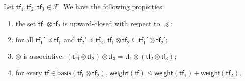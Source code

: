 \documentclass[10pt,a4paper]{article}
\renewcommand{\leq}{\leqslant}
\newcommand*{\transferflows}{\mathcal{F}}
\newcommand*{\tfweight}[1]{\mathsf{weight}(#1)}
\newcommand*{\minwqo}[1]{\mathsf{basis}(#1)}
\newcommand*{\atf}{\mathsf{tf}}
\newcommand*{\tftimes}{\otimes}
\newcommand*{\letf}{\preceq}
\begin{document}
%
\begin{lemmarep}%
	\label{prod-upward-closed}
	Let \(\atf_1, \atf_2, \atf_3 \in \transferflows\).
	We have the following properties:
	\begin{enumerate}[label = "\upshape(\ref{prod-upward-closed}.\roman*)", leftmargin = 1cm,topsep=3pt]
		\item \label{basic1} the set \(\atf_1 \tftimes \atf_2\) is upward-closed with respect to \(\letf\);
		\item \label{basic2} for all \(\atf_1' \letf \atf_1\) and \(\atf_2' \letf \atf_2\), \(\atf_1 \tftimes \atf_2 \subseteq \atf_1' \tftimes \atf_2'\);
		\item \label{basic3} \(\tftimes\) is associative: \((\atf_1 \tftimes \atf_2) \tftimes \atf_3 = \atf_1 \tftimes (\atf_2 \tftimes \atf_3)\);
		\item \label{basic4} for every \(\atf \in \minwqo{\atf_1 \tftimes \atf_2}\), \(\tfweight{\atf} \leq \tfweight{\atf_1} + \tfweight{\atf_2}\).
	\end{enumerate}
\end{lemmarep}
\end{document}
